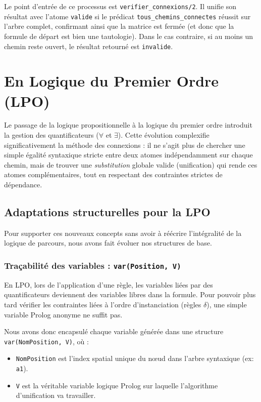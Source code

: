\documentclass[12pt, a4paper]{article}
\begin{document}
Le point d'entrée de ce processus est \texttt{verifier\_connexions/2}. Il unifie son résultat avec l'atome \texttt{valide} si le prédicat \texttt{tous\_chemins\_connectes} réussit sur l'arbre complet, confirmant ainsi que la matrice est fermée (et donc que la formule de départ est bien une tautologie). Dans le cas contraire, si au moins un chemin reste ouvert, le résultat retourné est \texttt{invalide}.

\section{En Logique du Premier Ordre (LPO)}

Le passage de la logique propositionnelle à la logique du premier ordre introduit la gestion des quantificateurs ($\forall$ et $\exists$). Cette évolution complexifie significativement la méthode des connexions : il ne s'agit plus de chercher une simple égalité syntaxique stricte entre deux atomes indépendamment sur chaque chemin, mais de trouver une \textit{substitution} globale valide (unification) qui rende ces atomes complémentaires, tout en respectant des contraintes strictes de dépendance.

\subsection{Adaptations structurelles pour la LPO}

Pour supporter ces nouveaux concepts sans avoir à réécrire l'intégralité de la logique de parcours, nous avons fait évoluer nos structures de base.

\subsubsection{Traçabilité des variables : \texttt{var(Position, V)}}

En LPO, lors de l'application d'une règle, les variables liées par des quantificateurs deviennent des variables libres dans la formule. Pour pouvoir plus tard vérifier les contraintes liées à l'ordre d'instanciation (règles $\delta$), une simple variable Prolog anonyme ne suffit pas. 

Nous avons donc encapsulé chaque variable générée dans une structure \texttt{var(NomPosition, V)}, où :
\begin{itemize}
    \item \texttt{NomPosition} est l'index spatial unique du nœud dans l'arbre syntaxique (ex: \texttt{a1}).
    \item \texttt{V} est la véritable variable logique Prolog sur laquelle l'algorithme d'unification va travailler.
\end{itemize}
\end{document}
